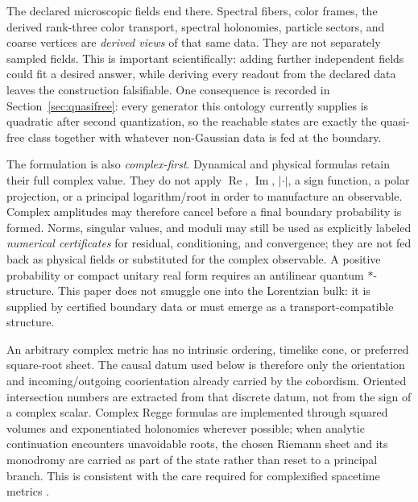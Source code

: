 \documentclass[11pt,letterpaper]{article}
\begin{document}
The declared microscopic fields end there. Spectral fibers, color frames, the
derived rank-three color transport, spectral holonomies, particle sectors, and coarse
vertices are \emph{derived views} of that same data. They are not separately
sampled fields. This is important scientifically:
adding further independent fields could fit a desired answer, while deriving
every readout from the declared data leaves the construction falsifiable. One consequence is recorded in
Section~\ref{sec:quasifree}: every generator this ontology currently supplies
is quadratic after second quantization, so the reachable states are exactly the
quasi-free class together with whatever non-Gaussian data is fed at the
boundary.

The formulation is also \emph{complex-first}. Dynamical and physical formulas
retain their full complex value. They do not apply
$\operatorname{Re}$, $\operatorname{Im}$, $|\cdot|$, a sign function, a polar
projection, or a principal logarithm/root in order to manufacture an
observable. Complex amplitudes may therefore cancel before a final boundary
probability is formed. Norms, singular values, and moduli may still be used as
explicitly labeled \emph{numerical certificates} for residual, conditioning,
and convergence; they are not fed back as physical fields or substituted for
the complex observable. A positive probability or compact unitary real form
requires an antilinear quantum $*$-structure. This paper does not smuggle one
into the Lorentzian bulk: it is supplied by certified boundary data or must
emerge as a transport-compatible structure.

An arbitrary complex metric has no intrinsic ordering, timelike cone, or
preferred square-root sheet. The causal datum used below is therefore only the
orientation and incoming/outgoing coorientation already carried by the
cobordism. Oriented intersection numbers are extracted from that discrete
datum, not from the sign of a complex scalar. Complex Regge formulas are
implemented through squared volumes and exponentiated holonomies wherever
possible; when analytic continuation encounters unavoidable roots, the chosen
Riemann sheet and its monodromy are carried as part of the state rather than
reset to a principal branch. This is consistent with the care required for
complexified spacetime metrics \cite{visser2022}.
\end{document}
